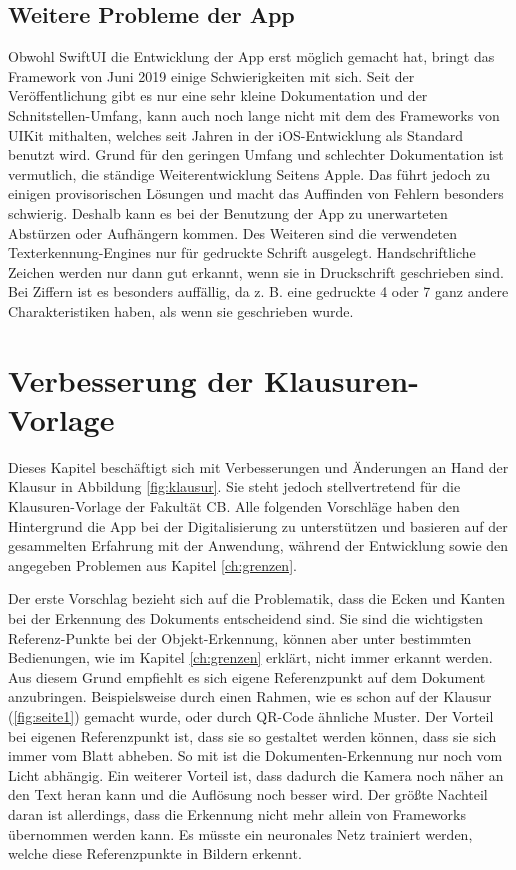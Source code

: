 \documentclass[nomenclature, oneside, 150]{HSMW-Thesis}
\begin{document}
	\section{Weitere Probleme der App}
		Obwohl SwiftUI die Entwicklung der App erst möglich gemacht hat, bringt das Framework von Juni 2019 einige Schwierigkeiten mit sich. Seit der Veröffentlichung gibt es nur eine sehr kleine Dokumentation und der Schnitstellen-Umfang, kann auch noch lange nicht mit dem des Frameworks von UIKit mithalten, welches seit Jahren in der iOS-Entwicklung als Standard benutzt wird. Grund für den geringen Umfang und schlechter Dokumentation ist vermutlich, die ständige Weiterentwicklung Seitens Apple. Das führt jedoch zu einigen provisorischen Lösungen und macht das Auffinden von Fehlern besonders schwierig. Deshalb kann es bei der Benutzung der App zu unerwarteten Abstürzen oder Aufhängern kommen. Des Weiteren sind die verwendeten Texterkennung-Engines nur für gedruckte Schrift ausgelegt. Handschriftliche Zeichen werden nur dann gut erkannt, wenn sie in Druckschrift geschrieben sind. Bei Ziffern ist es besonders auffällig, da z. B. eine gedruckte 4 oder 7 ganz andere Charakteristiken haben, als wenn sie geschrieben wurde.  
		

\chapter{Verbesserung der Klausuren-Vorlage}\label{ch:vorlage}
	Dieses Kapitel beschäftigt sich mit Verbesserungen und Änderungen an Hand der Klausur in Abbildung \ref{fig:klausur}. Sie steht jedoch stellvertretend für die Klausuren-Vorlage der Fakultät CB. Alle folgenden Vorschläge haben den Hintergrund die App bei der Digitalisierung zu unterstützen und basieren auf der gesammelten Erfahrung mit der Anwendung, während der Entwicklung sowie den angegeben Problemen aus Kapitel \ref{ch:grenzen}.
	
	Der erste Vorschlag bezieht sich auf die Problematik, dass die Ecken und Kanten bei der Erkennung des Dokuments entscheidend sind. Sie sind die wichtigsten Referenz-Punkte bei der Objekt-Erkennung, können aber unter bestimmten Bedienungen, wie im Kapitel \ref{ch:grenzen} erklärt, nicht immer erkannt werden. Aus diesem Grund empfiehlt es sich eigene Referenzpunkt auf dem Dokument anzubringen. Beispielsweise durch einen Rahmen, wie es schon auf der Klausur (\ref{fig:seite1}) gemacht wurde, oder durch QR-Code ähnliche Muster. Der Vorteil bei eigenen Referenzpunkt ist, dass sie so gestaltet werden können, dass sie sich immer vom Blatt abheben. So mit ist die Dokumenten-Erkennung nur noch vom Licht abhängig. Ein weiterer Vorteil ist, dass dadurch die Kamera noch näher an den Text heran kann und die Auflösung noch besser wird. Der größte Nachteil daran ist allerdings, dass die Erkennung nicht mehr allein von Frameworks übernommen werden kann. Es müsste ein neuronales Netz trainiert werden, welche diese Referenzpunkte in Bildern erkennt. 
	
\end{document}
